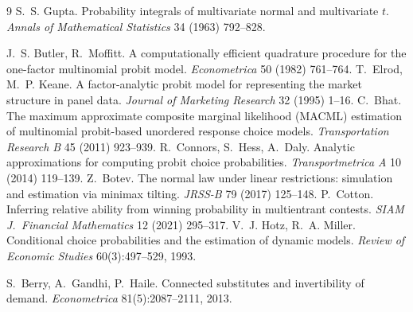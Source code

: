\documentclass[12pt]{article}
\theoremstyle{remark}
\begin{document}
\begin{thebibliography}{9}
 S.~S. Gupta. Probability integrals of
multivariate normal and multivariate $t$. \emph{Annals of Mathematical
Statistics} 34 (1963) 792--828.

 J.~S. Butler, R.~Moffitt. A computationally efficient
quadrature procedure for the one-factor multinomial probit model.
\emph{Econometrica} 50 (1982) 761--764.
 T.~Elrod, M.~P. Keane. A factor-analytic probit model for
representing the market structure in panel data. \emph{Journal of Marketing
Research} 32 (1995) 1--16.
 C.~Bhat. The maximum approximate composite marginal
likelihood (MACML) estimation of multinomial probit-based unordered response
choice models. \emph{Transportation Research B} 45 (2011) 923--939.
 R.~Connors, S.~Hess, A.~Daly. Analytic approximations
for computing probit choice probabilities. \emph{Transportmetrica A} 10
(2014) 119--139.
 Z.~Botev. The normal law under linear restrictions:
simulation and estimation via minimax tilting. \emph{JRSS-B} 79 (2017)
125--148.
 P.~Cotton. Inferring relative ability from winning
probability in multientrant contests. \emph{SIAM J.\ Financial Mathematics}
12 (2021) 295--317.
 V.~J. Hotz, R.~A. Miller. Conditional choice
probabilities and the estimation of dynamic models. \emph{Review of
Economic Studies} 60(3):497--529, 1993.

 S.~Berry, A.~Gandhi, P.~Haile. Connected substitutes
and invertibility of demand. \emph{Econometrica} 81(5):2087--2111, 2013.


\end{thebibliography}
\end{document}
